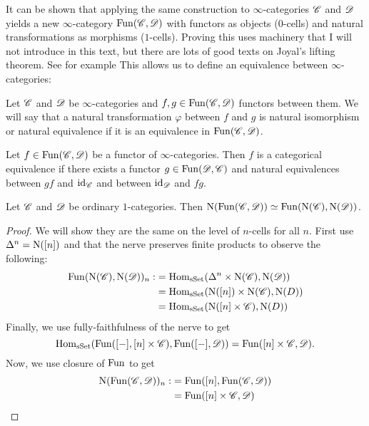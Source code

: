 \documentclass[../../thesis.tex]{subfiles}
\begin{document}
It can be shown that applying the same construction to $\infty$-categories $\mathscr{C}$ and $\mathscr{D}$ yields a new $\infty$-category $\mathrm{Fun}(\mathscr{C}, \mathscr{D})$ with functors as objects ($0$-cells) and natural transformations as morphisms ($1$-cells).
Proving this uses machinery that I will not introduce in this text, but there are lots of good texts on Joyal's lifting theorem.
See for example 
This allows us to define an equivalence between $\infty$-categories:
\begin{definition}
    Let $\mathscr{C}$ and $\mathscr{D}$ be $\infty$-categories and $f,g \in \mathrm{Fun}(\mathscr{C},\mathscr{D})$ functors between them.
    We will say that a natural transformation $\varphi$ between $f$ and $g$ is natural isomorphism  or natural equivalence if it is an equivalence in $ \mathrm{Fun}(\mathscr{C},\mathscr{D})$.
\end{definition}
\begin{definition}
    Let $f \in \mathrm{Fun}(\mathscr{C},\mathscr{D})$ be a functor of $\infty$-categories.
    Then $f$ is a categorical equivalence if there exists a functor $g\in\mathrm{Fun}(\mathscr{D},\mathscr{C})$ and natural equivalences between $gf$ and $\operatorname{id}_{\mathscr{C}}$ and between $\operatorname{id}_{\mathscr{D}}$ and $fg$.
\end{definition}
\begin{proposition}
    Let $\mathscr{C}$ and $\mathscr{D}$ be ordinary $1$-categories.
    Then $\mathrm{N}(\mathrm{Fun}(\mathscr{C}, \mathscr{D})) \simeq \mathrm{Fun}(\mathrm{N}(\mathscr{C}), \mathrm{N}(\mathscr{D}))$.
\end{proposition}
\begin{proof}
    We will show they are the same on the level of $n$-cells for all $n$.
    First use $\Delta^n = \mathrm{N}([n])$ and that the nerve preserves finite products to observe the following:
    \begin{align}
        \mathrm{Fun}(\mathrm{N}(\mathscr{C}), \mathrm{N}(\mathscr{D}))_n: & = \mathrm{Hom}_{\mathrm{sSet}}(\Delta^n \times \mathrm{N}(\mathscr{C}), \mathrm{N}(\mathscr{D}))  \\
                                        & = \mathrm{Hom}_{\mathrm{sSet}}(\mathrm{N}([n])\times \mathrm{N}(\mathscr{C}), \mathrm{N}(D)) \\
                                        & = \mathrm{Hom}_{\mathrm{sSet}}(\mathrm{N}([n]\times \mathscr{C}), \mathrm{N}(D))
    \end{align}
    Finally, we use fully-faithfulness of the nerve to get
    \[
        \mathrm{Hom}_{\mathrm{sSet}}(\mathrm{Fun}([-], [n]\times \mathscr{C}) , \mathrm{Fun}([-], \mathscr{D})) = \mathrm{Fun}([n]\times \mathscr{C}, \mathscr{D}).
    \]
    Now, we use closure of $\mathrm{Fun}$ to get
    \begin{align}
        \mathrm{N}(\mathrm{Fun}(\mathscr{C}, \mathscr{D}))_n: & = \mathrm{Fun}([n], \mathrm{Fun}(\mathscr{C}, \mathscr{D})) \\
                                & = \mathrm{Fun}([n]\times \mathscr{C}, \mathscr{D})
    \end{align}
\end{proof}
\end{document}
